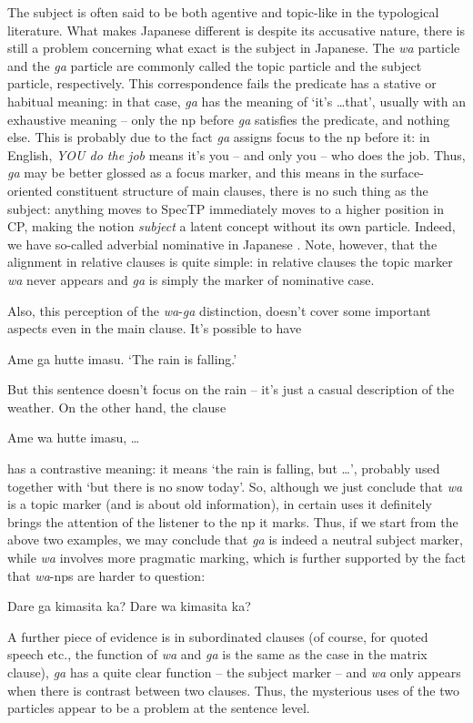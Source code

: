 \documentclass[UTF8, a4paper, oneside, scheme=plain]{ctexart}
\newcommand*{\citesec}[1]{\S~{#1}}
\newcommand*{\term}[1]{\emph{#1}}
\newcommand{\corpus}[1]{\emph{#1}}
\newcommand{\translate}[1]{`#1'}
\begin{document}
The subject is often said to be both agentive and topic-like in the typological literature.
What makes Japanese different is despite its accusative nature,
there is still a problem concerning what exact is the subject in Japanese.
The \corpus{wa} particle and the \corpus{ga} particle are commonly called 
the topic particle and the subject particle, respectively.
This correspondence fails the predicate has a stative or habitual meaning:
in that case, \corpus{ga} has the meaning of \translate{it's \dots that},
usually with an exhaustive meaning -- 
only the \ac{np} before \corpus{ga} satisfies the predicate,
and nothing else.
This is probably due to the fact \corpus{ga} assigns focus to the \ac{np} before it:
in English, \corpus{YOU do the job} means it's you -- and only you -- who does the job.
Thus, \corpus{ga} may be better glossed as a focus marker,
and this means in the surface-oriented constituent structure of main clauses, 
there is no such thing as the subject: 
anything moves to SpecTP immediately moves to a higher position in CP, 
making the notion \term{subject} a latent concept without its own particle.
Indeed, we have so-called adverbial nominative in Japanese \citet[\citesec{6.1}]{endo2007locality}.
Note, however, that the alignment in relative clauses is quite simple:
in relative clauses the topic marker \corpus{wa} never appears 
and \corpus{ga} is simply the marker of nominative case.

Also, this perception of the \corpus{wa}-\corpus{ga} distinction, 
doesn't cover some important aspects even in the main clause.
It's possible to have 
\begin{exe}
    \ex Ame ga hutte imasu. \translate{The rain is falling.}
\end{exe}
But this sentence doesn't focus on the rain -- 
it's just a casual description of the weather.
On the other hand, the clause 
\begin{exe}
    \ex Ame wa hutte imasu, \dots
\end{exe}
has a contrastive meaning: 
it means \translate{the rain is falling, but \dots},
probably used together with \translate{but there is no snow today}.
So, although we just conclude that \corpus{wa} is a topic marker 
(and is about old information),
in certain uses it definitely brings the attention of the listener to the \ac{np} it marks.
Thus, if we start from the above two examples, 
we may conclude that \corpus{ga} is indeed a neutral subject marker,
while \corpus{wa} involves more pragmatic marking,
which is further supported by the fact that 
\corpus{wa}-\ac{np}s are harder to question:
\begin{exe}
    \ex \begin{xlist}
        \ex Dare ga kimasita ka?
        \ex *Dare wa kimasita ka?
    \end{xlist}
\end{exe}
A further piece of evidence is in subordinated clauses
(of course, for quoted speech etc., the function of \corpus{wa} and \corpus{ga} 
is the same as the case in the matrix clause),
\corpus{ga} has a quite clear function -- the subject marker --
and \corpus{wa} only appears when there is contrast between two clauses.
Thus, the mysterious uses of the two particles appear to be a problem at the sentence level.
\end{document}
